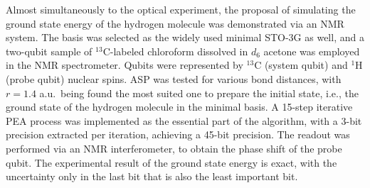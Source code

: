 \documentclass[8.5pt,twoside,twocolumn]{article}
\begin{document}
Almost simultaneously to the optical experiment, the proposal of
simulating the ground state energy of the hydrogen molecule was
demonstrated via an NMR system.\cite{NMR_static}
The basis was selected as the widely used minimal STO-3G as well,
and a two-qubit sample of $^{13}$C-labeled chloroform dissolved
in $d_6$ acetone was employed in the NMR spectrometer.
Qubits were represented by $^{13}$C (system qubit) and
$^{1}$H (probe qubit)
nuclear spins. ASP \cite{factoring} was tested for various bond
distances, with $r=1.4$ a.u.\ being found the most suited one to
prepare the initial state,
i.e., the ground state of the hydrogen molecule in the minimal basis.
A 15-step iterative PEA process was implemented as the essential part of
the algorithm, with a 3-bit precision extracted per iteration,
achieving a 45-bit precision. The readout was performed
via an NMR interferometer,\cite{inter1,inter2,inter3} to obtain
the phase shift of the probe qubit.
The experimental result of the ground state energy is exact,
with the uncertainty only in the last bit that is also the least
important bit.
\end{document}
